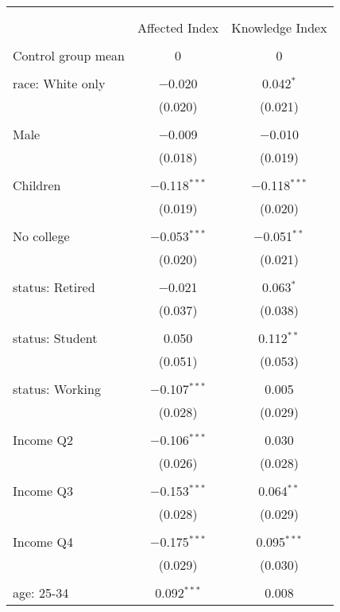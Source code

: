 
\begin{tabular}{@{\extracolsep{5pt}}lcc} 
\\[-1.8ex]\hline 
\hline \\[-1.8ex] 
\\[-1.8ex] & Affected Index & Knowledge Index \\ 
\hline \\[-1.8ex] 
 Control group mean & 0 & 0  \\ \hline \\[-1.8ex] race: White only & $-$0.020 & 0.042$^{*}$ \\ 
  & (0.020) & (0.021) \\ 
  & & \\ 
 Male & $-$0.009 & $-$0.010 \\ 
  & (0.018) & (0.019) \\ 
  & & \\ 
 Children & $-$0.118$^{***}$ & $-$0.118$^{***}$ \\ 
  & (0.019) & (0.020) \\ 
  & & \\ 
 No college & $-$0.053$^{***}$ & $-$0.051$^{**}$ \\ 
  & (0.020) & (0.021) \\ 
  & & \\ 
 status: Retired & $-$0.021 & 0.063$^{*}$ \\ 
  & (0.037) & (0.038) \\ 
  & & \\ 
 status: Student & 0.050 & 0.112$^{**}$ \\ 
  & (0.051) & (0.053) \\ 
  & & \\ 
 status: Working & $-$0.107$^{***}$ & 0.005 \\ 
  & (0.028) & (0.029) \\ 
  & & \\ 
 Income Q2 & $-$0.106$^{***}$ & 0.030 \\ 
  & (0.026) & (0.028) \\ 
  & & \\ 
 Income Q3 & $-$0.153$^{***}$ & 0.064$^{**}$ \\ 
  & (0.028) & (0.029) \\ 
  & & \\ 
 Income Q4 & $-$0.175$^{***}$ & 0.095$^{***}$ \\ 
  & (0.029) & (0.030) \\ 
  & & \\ 
 age: 25-34 & 0.092$^{***}$ & 0.008 \\ 

\end{tabular}
